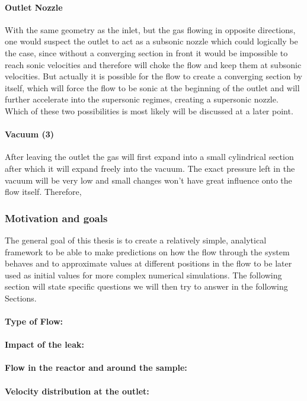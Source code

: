 \paragraph{Outlet Nozzle}
With the same geometry as the inlet, but the gas flowing in opposite directions, one would suspect the outlet to act as a subsonic nozzle which could logically be the case, since without a converging section in front it would be impossible to reach sonic velocities and therefore will choke the flow and keep them at subsonic velocities. But actually it is possible for the flow to create a converging section by itself, which will force the flow to be sonic at the beginning of the outlet and will further accelerate into the supersonic regimes, creating a supersonic nozzle. Which of these two possibilities is most likely will be discussed at a later point.

\paragraph{Vacuum (3)}
After leaving the outlet the gas will first expand into a small cylindrical section after which it will expand freely into the vacuum. The exact pressure left in the vacuum will be very low and small changes won't have great influence onto the flow itself. Therefore,

\newpage

\subsubsection{Motivation and goals}
The general goal of this thesis is to create a relatively simple, analytical framework to be able to make predictions on how the flow through the system behaves and to approximate values at different positions in the flow to be later used as initial values for more complex numerical simulations. The following section will state specific questions we will then try to answer in the following Sections.

\paragraph{Type of Flow:}

\paragraph{Impact of the leak:}

\paragraph{Flow in the reactor and around the sample:}

\paragraph{Velocity distribution at the outlet:}
